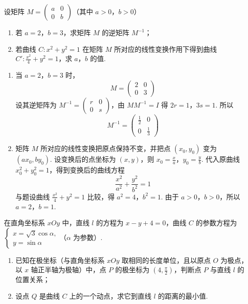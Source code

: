 \begin{problem}
设矩阵 \(M = \begin{pmatrix} a & 0 \\ 0 & b \end{pmatrix}\)（其中 \(a > 0\)，\(b > 0\)）

\begin{enumerate}
\item 若 \(a = 2\)，\(b = 3\)，求矩阵 \(M\) 的逆矩阵 \(M^{-1}\)；
\item 若曲线 \(C: x^{2} + y^{2} = 1\) 在矩阵 \(M\) 所对应的线性变换作用下得到曲线
\(C' : \frac{x^{2}}{4} + y^{2} = 1\)，求 \(a\)，\(b\) 的值.
\end{enumerate}
\end{problem}

\begin{solution}
\begin{enumerate}
\item 当 \(a=2\)，\(b=3\) 时，
\[
M=\begin{pmatrix}2&0\\0&3\end{pmatrix}
\]
设其逆矩阵为 \(M^{-1}=\begin{pmatrix}r&0\\0&s\end{pmatrix}\)，由 \(MM^{-1}=I\) 得 \(2r=1\)，\(3s=1\). 所以
\[
M^{-1}=\begin{pmatrix}\frac{1}{2}&0\\0&\frac{1}{3}\end{pmatrix}
\]

\item 矩阵 \(M\) 所对应的线性变换把原点保持不变，并把点 \((x_0,y_0)\) 变为 \((ax_0,by_0)\). 设变换后的点坐标为 \((x,y)\)，则 \(x_0=\frac{x}{a}\)，\(y_0=\frac{y}{b}\). 代入原曲线 \(x_0^2+y_0^2=1\)，得到变换后的曲线方程
\[
\frac{x^2}{a^2}+\frac{y^2}{b^2}=1
\]
与题设曲线 \(\frac{x^2}{4}+y^2=1\) 比较，得 \(a^2=4\)，\(b^2=1\). 由于 \(a>0\)，\(b>0\)，所以 \(a=2\)，\(b=1\).
\end{enumerate}
\end{solution}

\begin{problem}
在直角坐标系 \(xOy\) 中，直线 \(l\) 的方程为 \(x-y+4=0\)，曲线 \(C\) 的参数方程为 \(\begin{cases}
x=\sqrt{3}\cos\alpha,\\
y=\sin\alpha
\end{cases}\)（\(\alpha\) 为参数）.

\begin{enumerate}
\item 已知在极坐标（与直角坐标系 \(xOy\) 取相同的长度单位，且以原点 \(O\) 为极点，以 \(x\) 轴正半轴为极轴）中，点 \(P\) 的极坐标为 \(\left(4,\frac{\pi}{2}\right)\)，判断点 \(P\) 与直线 \(l\) 的位置关系；
\item 设点 \(Q\) 是曲线 \(C\) 上的一个动点，求它到直线 \(l\) 的距离的最小值.
\end{enumerate}
\end{problem}

